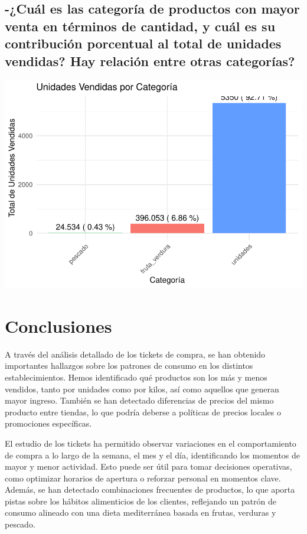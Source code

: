 \documentclass[,article,submit,moreauthors,pdftex]{Definitions/mdpi}
\begin{document}
\hypertarget{cuuxe1l-es-las-categoruxeda-de-productos-con-mayor-venta-en-tuxe9rminos-de-cantidad-y-cuuxe1l-es-su-contribuciuxf3n-porcentual-al-total-de-unidades-vendidas-hay-relaciuxf3n-entre-otras-categoruxedas}{%
\subsection{-¿Cuál es las categoría de productos con mayor venta en
términos de cantidad, y cuál es su contribución porcentual al total de
unidades vendidas? Hay relación entre otras
categorías?}\label{cuuxe1l-es-las-categoruxeda-de-productos-con-mayor-venta-en-tuxe9rminos-de-cantidad-y-cuuxe1l-es-su-contribuciuxf3n-porcentual-al-total-de-unidades-vendidas-hay-relaciuxf3n-entre-otras-categoruxedas}}

\includegraphics[width=0.9\linewidth]{ProyectoTD2025_files/figure-latex/unnamed-chunk-33-1}

\hypertarget{conclusiones}{%
\section{Conclusiones}\label{conclusiones}}

A través del análisis detallado de los tickets de compra, se han
obtenido importantes hallazgos sobre los patrones de consumo en los
distintos establecimientos. Hemos identificado qué productos son los más
y menos vendidos, tanto por unidades como por kilos, así como aquellos
que generan mayor ingreso. También se han detectado diferencias de
precios del mismo producto entre tiendas, lo que podría deberse a
políticas de precios locales o promociones específicas.

El estudio de los tickets ha permitido observar variaciones en el
comportamiento de compra a lo largo de la semana, el mes y el día,
identificando los momentos de mayor y menor actividad. Esto puede ser
útil para tomar decisiones operativas, como optimizar horarios de
apertura o reforzar personal en momentos clave. Además, se han detectado
combinaciones frecuentes de productos, lo que aporta pistas sobre los
hábitos alimenticios de los clientes, reflejando un patrón de consumo
alineado con una dieta mediterránea basada en frutas, verduras y
pescado.
\end{document}
